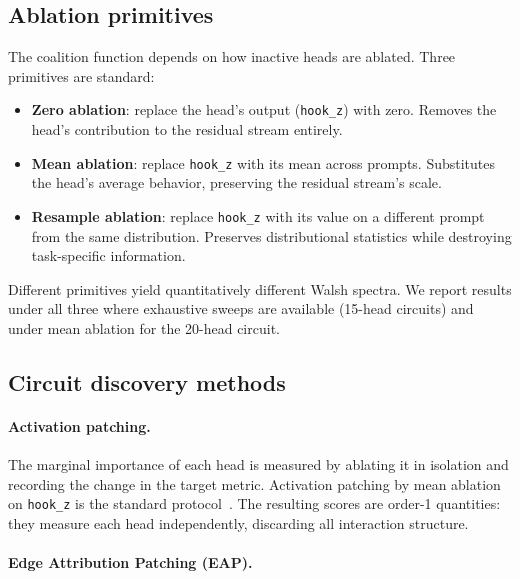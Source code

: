\subsection{Ablation primitives}
\label{sec:ablation-primitives}

The coalition function depends on how inactive heads are ablated.
Three primitives are standard:

\begin{itemize}
\item \textbf{Zero ablation}: replace the head's output
  (\texttt{hook\_z}) with zero. Removes the head's contribution to the
  residual stream entirely.

\item \textbf{Mean ablation}: replace \texttt{hook\_z} with its mean
  across prompts. Substitutes the head's average behavior, preserving
  the residual stream's scale.

\item \textbf{Resample ablation}: replace \texttt{hook\_z} with its
  value on a different prompt from the same distribution. Preserves
  distributional statistics while destroying task-specific information.
\end{itemize}

Different primitives yield quantitatively different Walsh spectra. We
report results under all three where exhaustive sweeps are available
(15-head circuits) and under mean ablation for the 20-head circuit.

\subsection{Circuit discovery methods}
\label{sec:discovery-methods}

\paragraph{Activation patching.}

The marginal importance of each head is measured by ablating it in
isolation and recording the change in the target metric. Activation
patching by mean ablation on \texttt{hook\_z} is the standard
protocol~\citep{wang2022ioi}. The resulting scores are order-1
quantities: they measure each head independently, discarding all
interaction structure.

\paragraph{Edge Attribution Patching (EAP).}

